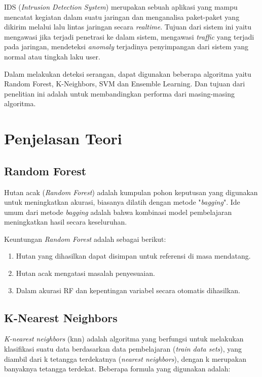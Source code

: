 \documentclass[conference]{IEEEtran}
\begin{document}
IDS (\emph{Intrusion Detection System}) merupakan sebuah aplikasi yang mampu mencatat kegiatan dalam suatu jaringan dan menganalisa paket-paket yang dikirim melalui lalu lintas jaringan secara \emph{realtime}. Tujuan dari sistem ini yaitu mengawasi jika terjadi penetrasi ke dalam sistem, mengawasi \emph{traffic} yang terjadi pada jaringan, mendeteksi \emph{anomaly} terjadinya penyimpangan dari sistem yang normal atau tingkah laku user.

Dalam melakukan deteksi serangan, dapat digunakan beberapa algoritma  yaitu Random Forest, K-Neighbors, SVM dan Ensemble Learning. Dan tujuan dari penelitian ini adalah untuk membandingkan performa dari masing-masing algoritma.

\section{Penjelasan Teori}

\subsection{Random Forest}

Hutan acak (\emph{Random Forest}) adalah kumpulan pohon keputusan yang digunakan untuk meningkatkan akurasi, biasanya dilatih dengan metode "\emph{bagging}". Ide umum dari metode \emph{bagging} adalah bahwa kombinasi model pembelajaran meningkatkan hasil secara keseluruhan.

Keuntungan \emph{Random Forest} adalah sebagai berikut\cite{farnaaz2016random}:

\begin{enumerate}
\item Hutan yang dihasilkan dapat disimpan untuk referensi di masa mendatang.
\item Hutan acak mengatasi masalah penyesuaian.
\item Dalam akurasi RF dan kepentingan variabel secara otomatis dihasilkan.
\end{enumerate}


\subsection{K-Nearest Neighbors}

\emph{K-nearest neighbors} (knn) adalah algoritma yang berfungsi untuk melakukan klasifikasi suatu data berdasarkan data pembelajaran (\emph{train data sets}), yang diambil dari k tetangga terdekatnya (\emph{nearest neighbors}), dengan k merupakan banyaknya tetangga terdekat. Beberapa formula yang digunakan adalah:
\end{document}
